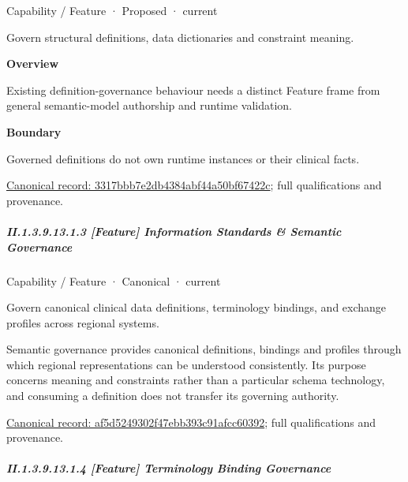 \label{element:3317bbb7e2db4384abf44a50bf67422c}
{\small Capability / Feature · Proposed · current}\par

Govern structural definitions, data dictionaries and constraint meaning.



\textbf{Overview}



Existing definition-governance behaviour needs a distinct Feature frame from general semantic-model authorship and runtime validation.



\textbf{Boundary}



Governed definitions do not own runtime instances or their clinical facts.


{\footnotesize \href{../../../../continuum/strategy/capability/feature/3317bbb7e2db4384abf44a50bf67422c.md}{Canonical record: 3317bbb7e2db4384abf44a50bf67422c}; full qualifications and provenance.}\par
\subparagraph*{II.1.3.9.13.1.3 [Feature] Information Standards \& Semantic Governance}
\label{navigation:II.1.3.9.13.1.3}

\label{element:af5d5249302f47ebb393c91afcc60392}
{\small Capability / Feature · Canonical · current}\par

Govern canonical clinical data definitions, terminology bindings, and exchange profiles across regional systems.



Semantic governance provides canonical definitions, bindings and profiles through which regional representations can be understood consistently. Its purpose concerns meaning and constraints rather than a particular schema technology, and consuming a definition does not transfer its governing authority.


{\footnotesize \href{../../../../continuum/strategy/capability/feature/af5d5249302f47ebb393c91afcc60392.md}{Canonical record: af5d5249302f47ebb393c91afcc60392}; full qualifications and provenance.}\par
\subparagraph*{II.1.3.9.13.1.4 [Feature] Terminology Binding Governance}
\label{navigation:II.1.3.9.13.1.4}

